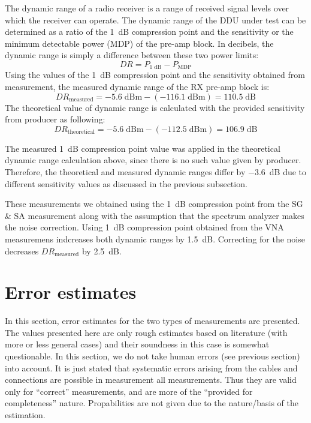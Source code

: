 \documentclass[a4paper, 12pt]{article}
\begin{document}
The dynamic range of a radio receiver is a range of received signal levels over which the receiver 
can operate. The dynamic range of the DDU under test can be determined as a ratio of the 1~dB 
compression point and the sensitivity or the minimum detectable power (MDP) of the pre-amp block. 
In decibels, the dynamic range is simply a difference between these two power limits:
\begin{equation}
\mathit{DR} = P_\mathrm{1\;dB} - P_\mathrm{MDP} 
\end{equation}
Using the values of the 1~dB compression point and the sensitivity obtained from measurement, the 
measured dynamic range of the RX pre-amp block is:
\begin{equation}
\mathit{DR}_\mathrm{measured} = -5.6 \mathrm{\;dBm} - (-116.1 \mathrm{\;dBm}) = 110.5 \mathrm{\;dB}
\end{equation}
The theoretical value of dynamic range is calculated with the provided sensitivity from producer as 
following:
\begin{equation}
\mathit{DR}_\mathrm{theoretical} = -5.6 \mathrm{\;dBm} - (-112.5 \mathrm{\;dBm}) = 106.9 \mathrm{\;dB}
\end{equation}

The measured 1~dB compression point value was applied in the theoretical dynamic range calculation 
above, since there is no such value given by producer. Therefore, the theoretical and measured dynamic 
ranges differ by $-3.6$~dB due to different sensitivity values as discussed in the 
previous subsection.

These measurements we obtained using the 1~dB compression point from the SG \& SA measurement along 
with the assumption that the spectrum analyzer makes the noise correction. Using 1~dB compression point 
obtained from the VNA measuremens indcreases both dynamic ranges by 1.5~dB. Correcting for the noise 
decreases $\mathit{DR}_\mathrm{measured}$ by 2.5~dB.


\newpage
\section{Error estimates}

In this section, error estimates for the two types of measurements are presented.
The values presented here are only rough estimates based on literature (with more 
or less general cases) and their soundness in this case is somewhat questionable. 
In this section, we do not take human errors (see previous section) into account. 
It is just stated that systematic errors arising from the cables and connections 
are possible in measurement all measurements. Thus they are valid only for 
``correct'' measurements, and are more of the ``provided for completeness'' 
nature. Propabilities are not given due to the nature/basis of the estimation.
\end{document}
